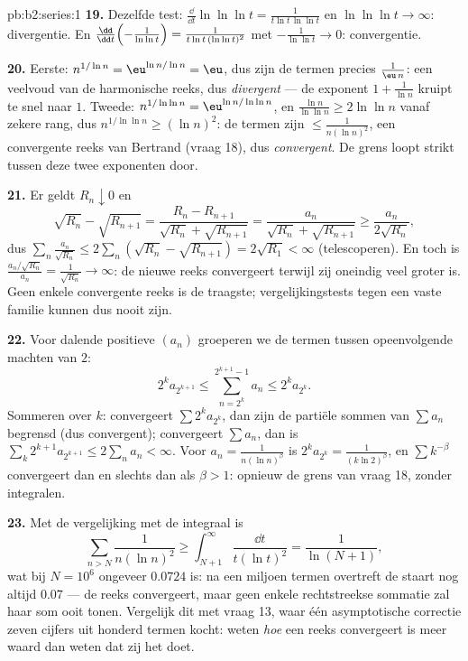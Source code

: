 \begin{solution}{pb:b2:series:1}
\textbf{19.} Dezelfde test: $\frac{\dd}{\dd t}\ln\ln\ln t =
\frac{1}{t\ln t\,\ln\ln t}$ en $\ln\ln\ln t \to \infty$:
divergentie. En $\frac{\dd}{\dd t}\Bigl(-\frac1{\ln\ln t}\Bigr) =
\frac{1}{t\ln t\,(\ln\ln t)^2}$ met $-\frac1{\ln\ln t} \to 0$:
convergentie.

\textbf{20.} Eerste: $n^{1/\ln n} = \eu^{\ln n/\ln n} = \eu$, dus
zijn de termen precies $\frac{1}{\eu\,n}$: een veelvoud van de
harmonische reeks, dus \emph{divergent} --- de exponent $1 +
\frac1{\ln n}$ kruipt te snel naar $1$. Tweede: $n^{1/\ln\ln n} =
\eu^{\ln n/\ln\ln n}$, en $\frac{\ln n}{\ln\ln n} \geq 2\ln\ln n$
vanaf zekere rang, dus $n^{1/\ln\ln n} \geq (\ln n)^2$: de termen
zijn $\leq \frac1{n(\ln n)^2}$, een convergente reeks van Bertrand
(vraag 18), dus \emph{convergent}. De grens loopt strikt tussen
deze twee exponenten door.

\textbf{21.} Er geldt $R_n \downarrow 0$ en
\[
\sqrt{R_n} - \sqrt{R_{n+1}} = \frac{R_n -
R_{n+1}}{\sqrt{R_n} + \sqrt{R_{n+1}}} =
\frac{a_n}{\sqrt{R_n} + \sqrt{R_{n+1}}} \geq
\frac{a_n}{2\sqrt{R_n}},
\]
dus $\sum_n \frac{a_n}{\sqrt{R_n}} \leq 2\sum_n(\sqrt{R_n} -
\sqrt{R_{n+1}}) = 2\sqrt{R_1} < \infty$ (telescoperen). En toch is
$\frac{a_n/\sqrt{R_n}}{a_n} = \frac1{\sqrt{R_n}} \to \infty$: de
nieuwe reeks convergeert terwijl zij oneindig veel groter is. Geen
enkele convergente reeks is de traagste; vergelijkingstests tegen
een vaste familie kunnen dus nooit  zijn.

\textbf{22.} Voor dalende positieve $(a_n)$ groeperen we de termen
tussen opeenvolgende machten van $2$:
\[
2^{k}a_{2^{k+1}} \leq \sum_{n=2^k}^{2^{k+1}-1} a_n \leq
2^ka_{2^k} .
\]
Sommeren over $k$: convergeert $\sum 2^ka_{2^k}$, dan zijn de
partiële sommen van $\sum a_n$ begrensd (dus convergent);
convergeert $\sum a_n$, dan is $\sum_k 2^{k+1}a_{2^{k+1}} \leq
2\sum_n a_n < \infty$. Voor $a_n = \frac1{n(\ln n)^\beta}$ is
$2^ka_{2^k} = \frac{1}{(k\ln 2)^\beta}$, en $\sum k^{-\beta}$
convergeert dan en slechts dan als $\beta > 1$: opnieuw de grens
van vraag 18, zonder integralen.

\textbf{23.} Met de vergelijking met de integraal is
\[
\sum_{n > N}\frac{1}{n(\ln n)^2} \geq
\int_{N+1}^{\infty}\frac{\dd t}{t(\ln t)^2} =
\frac{1}{\ln(N+1)},
\]
wat bij $N = 10^6$ ongeveer $0.0724$ is: na een miljoen termen
overtreft de staart nog altijd $0.07$ --- de reeks convergeert,
maar geen enkele rechtstreekse sommatie zal haar som ooit tonen.
Vergelijk dit met vraag 13, waar één asymptotische correctie zeven
cijfers uit honderd termen kocht: weten \emph{hoe} een reeks
convergeert is meer waard dan weten dat zij het doet.


\end{solution}
